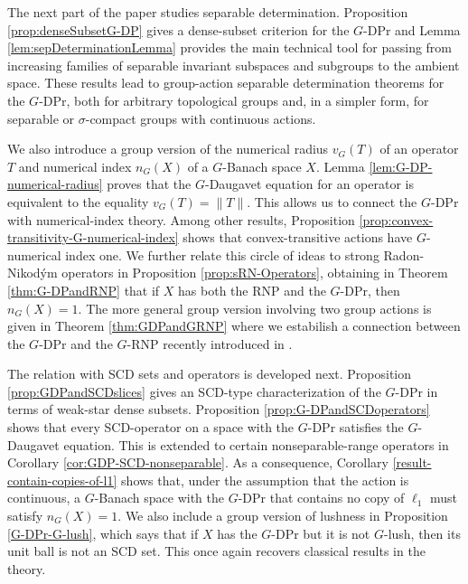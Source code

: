 \documentclass[a4paper,12pt]{amsart}
\theoremstyle{definition}
\theoremstyle{definition}
\theoremstyle{remark}
\numberwithin{equation}{section}
\newcommand{\<}{\langle}
\renewcommand{\>}{\rangle}
\begin{document}
	The next part of the paper studies separable determination. Proposition \ref{prop:denseSubsetG-DP} gives a dense-subset criterion for the $G$-DPr and Lemma \ref{lem:sepDeterminationLemma} provides the main technical tool for passing from increasing families of separable invariant subspaces and subgroups to the ambient space. These results lead to group-action separable determination theorems for the $G$-DPr, both for arbitrary topological groups and, in a simpler form, for separable or $\sigma$-compact groups with continuous actions.
	
	We also introduce a group version of the numerical radius $v_G(T)$ of an operator $T$ and numerical index $n_G(X)$ of a $G$-Banach space $X$. Lemma \ref{lem:G-DP-numerical-radius} proves that the $G$-Daugavet equation for an operator is equivalent to the equality $v_G(T)=\|T\|$. This allows us to connect the $G$-DPr with numerical-index theory. Among other results, Proposition \ref{prop:convex-transitivity-G-numerical-index} shows that convex-transitive actions have $G$-numerical index one. We further relate this circle of ideas to strong Radon-Nikodým operators in Proposition \ref{prop:sRN-Operators}, obtaining in Theorem \ref{thm:G-DPandRNP} that if $X$ has both the RNP and the $G$-DPr, then $n_G(X)=1$. The more general group version involving two group actions is given in Theorem \ref{thm:GDPandGRNP} where we estabilish a connection between the $G$-DPr and the $G$-RNP recently introduced in \cite{DantasDouchaJungRaunig2025}.
	
	The relation with SCD sets and operators is developed next. Proposition \ref{prop:GDPandSCDslices} gives an SCD-type characterization of the $G$-DPr in terms of weak-star dense subsets. Proposition \ref{prop:G-DPandSCDoperators} shows that every SCD-operator on a space with the $G$-DPr satisfies the $G$-Daugavet equation. This is extended to certain nonseparable-range operators in Corollary \ref{cor:GDP-SCD-nonseparable}. As a consequence, Corollary \ref{result-contain-copies-of-l1} shows that, under the assumption that the action is continuous, a $G$-Banach space with the $G$-DPr that contains no copy of $\ell_1$ must satisfy $n_G(X)=1$. We also include a group version of lushness in Proposition \ref{G-DPr-G-lush}, which says that if $X$ has the $G$-DPr but it is not $G$-lush, then its unit ball is not an SCD set. This once again recovers classical results in the theory.
	
\end{document}
